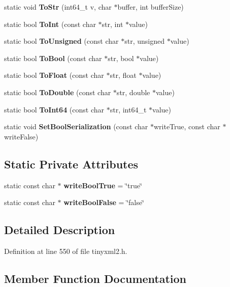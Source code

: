 \begin{DoxyCompactItemize}
\item 
static void \textbf{ To\+Str} (int64\+\_\+t v, char $\ast$buffer, int buffer\+Size)
\item 
static bool \textbf{ To\+Int} (const char $\ast$str, int $\ast$value)
\item 
static bool \textbf{ To\+Unsigned} (const char $\ast$str, unsigned $\ast$value)
\item 
static bool \textbf{ To\+Bool} (const char $\ast$str, bool $\ast$value)
\item 
static bool \textbf{ To\+Float} (const char $\ast$str, float $\ast$value)
\item 
static bool \textbf{ To\+Double} (const char $\ast$str, double $\ast$value)
\item 
static bool \textbf{ To\+Int64} (const char $\ast$str, int64\+\_\+t $\ast$value)
\item 
static void \textbf{ Set\+Bool\+Serialization} (const char $\ast$write\+True, const char $\ast$write\+False)
\end{DoxyCompactItemize}
\subsection*{Static Private Attributes}
\begin{DoxyCompactItemize}
\item 
static const char $\ast$ \textbf{ write\+Bool\+True} = \char`\"{}true\char`\"{}
\item 
static const char $\ast$ \textbf{ write\+Bool\+False} = \char`\"{}false\char`\"{}
\end{DoxyCompactItemize}


\subsection{Detailed Description}


Definition at line 550 of file tinyxml2.\+h.



\subsection{Member Function Documentation}
\mbox{\label{classtinyxml2_1_1_x_m_l_util_a31c00d5c5dfb38382de1dfcaf4be3595}} 
